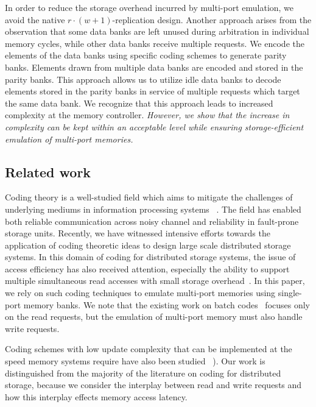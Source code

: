 In order to reduce the storage overhead incurred by multi-port emulation, we avoid the native $r\cdot(w + 1)$-replication design. Another approach arises from the observation that some data banks are left unused during arbitration in individual memory cycles, while other data banks receive multiple requests. We encode the elements of the data banks using specific coding schemes to generate parity banks. Elements drawn from multiple data banks are encoded and stored in the parity banks. This approach allows us to utilize idle data banks to decode elements stored in the parity banks in service of multiple requests which target the same data bank. We recognize that this approach leads to increased complexity at the memory controller. {\color{red} {\em However, we show that the increase in complexity can be kept within an acceptable level while ensuring storage-efficient emulation of multi-port memories.}}

\subsection{Related work}

Coding theory is a well-studied field which aims to mitigate the challenges of underlying mediums in information processing systems ~\cite{MacSlo, Cover}. The field has enabled both reliable communication across noisy channel and reliability in fault-prone storage units. Recently, we have witnessed intensive efforts towards the application of coding theoretic ideas to design large scale distributed storage systems\cite{Azure, SAPDVCB13, Rashmi14}. In this domain of coding for distributed storage systems, the issue of access efficiency has also received attention, especially the ability to support multiple simultaneous read accesses with small storage overhead~\cite{batchcodes, RPDV16, RSDG16, Wang2017}. In this paper, we rely on such coding techniques to emulate multi-port memories using single-port memory banks. We note that the existing work on batch codes~\cite{batchcodes} focuses only on the read requests, but the emulation of multi-port memory must also handle write requests. 

Coding schemes with low update complexity that can be implemented at the speed memory systems require have also been studied ~\cite{ASV10, MCW14}). Our work is distinguished from the majority of the literature on coding for distributed storage, because we consider the interplay between read and write requests and how this interplay effects memory access latency.

